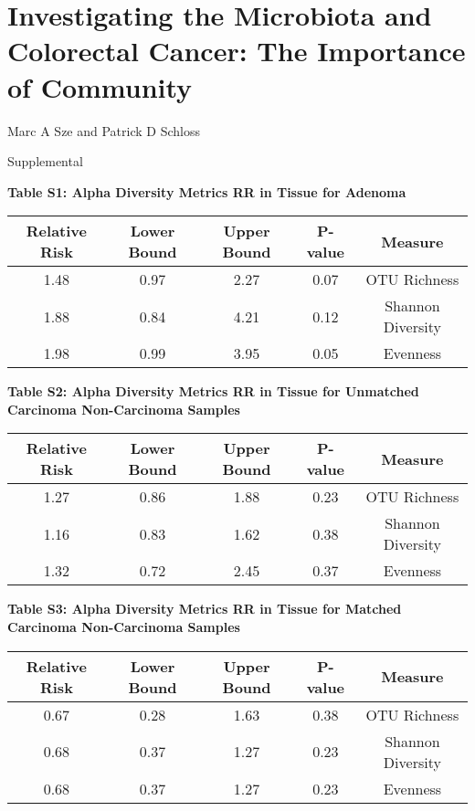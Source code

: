 \documentclass[12pt,]{article}
\title{}
\author{}
\date{}
\begin{document}
\section{Investigating the Microbiota and Colorectal Cancer: The
Importance of
Community}\label{investigating-the-microbiota-and-colorectal-cancer-the-importance-of-community}

\vspace{10mm}

\begin{center}
Marc A Sze and Patrick D Schloss

\vspace{10mm}

Supplemental
\end{center}

\newpage

\textbf{Table S1: Alpha Diversity Metrics RR in Tissue for Adenoma}

\begin{longtable}[]{@{}ccccc@{}}
\toprule
Relative Risk & Lower Bound & Upper Bound & P-value &
Measure\tabularnewline
\midrule
\endhead
1.48 & 0.97 & 2.27 & 0.07 & OTU Richness\tabularnewline
1.88 & 0.84 & 4.21 & 0.12 & Shannon Diversity\tabularnewline
1.98 & 0.99 & 3.95 & 0.05 & Evenness\tabularnewline
\bottomrule
\end{longtable}

\newpage

\textbf{Table S2: Alpha Diversity Metrics RR in Tissue for Unmatched
Carcinoma Non-Carcinoma Samples}

\begin{longtable}[]{@{}ccccc@{}}
\toprule
Relative Risk & Lower Bound & Upper Bound & P-value &
Measure\tabularnewline
\midrule
\endhead
1.27 & 0.86 & 1.88 & 0.23 & OTU Richness\tabularnewline
1.16 & 0.83 & 1.62 & 0.38 & Shannon Diversity\tabularnewline
1.32 & 0.72 & 2.45 & 0.37 & Evenness\tabularnewline
\bottomrule
\end{longtable}

\newpage

\textbf{Table S3: Alpha Diversity Metrics RR in Tissue for Matched
Carcinoma Non-Carcinoma Samples}

\begin{longtable}[]{@{}ccccc@{}}
\toprule
Relative Risk & Lower Bound & Upper Bound & P-value &
Measure\tabularnewline
\midrule
\endhead
0.67 & 0.28 & 1.63 & 0.38 & OTU Richness\tabularnewline
0.68 & 0.37 & 1.27 & 0.23 & Shannon Diversity\tabularnewline
0.68 & 0.37 & 1.27 & 0.23 & Evenness\tabularnewline
\bottomrule
\end{longtable}
\end{document}
